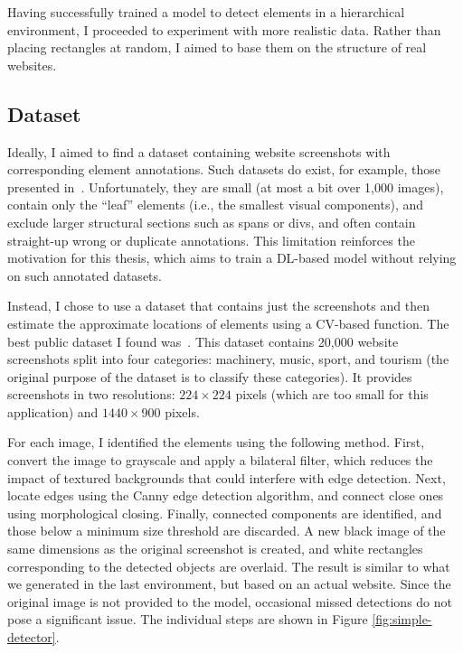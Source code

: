 \documentclass[
  digital,     %
  oneside,     %
  nosansbold,  %
  nocolorbold, %
  lof,         %
  lot,         %
]{fithesis4}
\begin{document}
Having successfully trained a model to detect elements in a hierarchical environment, I proceeded to experiment with more realistic data. Rather than placing rectangles at random, I aimed to base them on the structure of real websites.

\subsection{Dataset}
\label{subsec:dataset}

Ideally, I aimed to find a dataset containing website screenshots with corresponding element annotations. Such datasets do exist, for example, those presented in~\cite{roboflow-dataset-1, roboflow-dataset-2}. Unfortunately, they are small (at most a bit over 1,000 images), contain only the \enquote{leaf} elements (i.e., the smallest visual components), and exclude larger structural sections such as spans or divs, and often contain straight-up wrong or duplicate annotations. This limitation reinforces the motivation for this thesis, which aims to train a DL-based model without relying on such annotated datasets.

Instead, I chose to use a dataset that contains just the screenshots and then estimate the approximate locations of elements using a CV-based function. The best public dataset I found was~\cite{aydos2020}. This dataset contains 20,000 website screenshots split into four categories: machinery, music, sport, and tourism (the original purpose of the dataset is to classify these categories). It provides screenshots in two resolutions: $224\times224$ pixels (which are too small for this application) and $1440\times900$ pixels.

For each image, I identified the elements using the following method. First, convert the image to grayscale and apply a bilateral filter, which reduces the impact of textured backgrounds that could interfere with edge detection. Next, locate edges using the Canny edge detection algorithm, and connect close ones using morphological closing. Finally, connected components are identified, and those below a minimum size threshold are discarded. A new black image of the same dimensions as the original screenshot is created, and white rectangles corresponding to the detected objects are overlaid. The result is similar to what we generated in the last environment, but based on an actual website. Since the original image is not provided to the model, occasional missed detections do not pose a significant issue. The individual steps are shown in Figure \ref{fig:simple-detector}.
\end{document}
